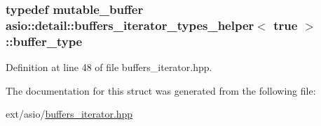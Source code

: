 \subsubsection[{buffer\+\_\+type}]{\setlength{\rightskip}{0pt plus 5cm}typedef {\bf mutable\+\_\+buffer} {\bf asio\+::detail\+::buffers\+\_\+iterator\+\_\+types\+\_\+helper}$<$ true $>$\+::{\bf buffer\+\_\+type}}\label{structasio_1_1detail_1_1buffers__iterator__types__helper_3_01true_01_4_afadfeb16c850d47114205f7d4b671bd5}


Definition at line 48 of file buffers\+\_\+iterator.\+hpp.



The documentation for this struct was generated from the following file\+:\begin{DoxyCompactItemize}
\item 
ext/asio/\hyperlink{buffers__iterator_8hpp}{buffers\+\_\+iterator.\+hpp}\end{DoxyCompactItemize}
